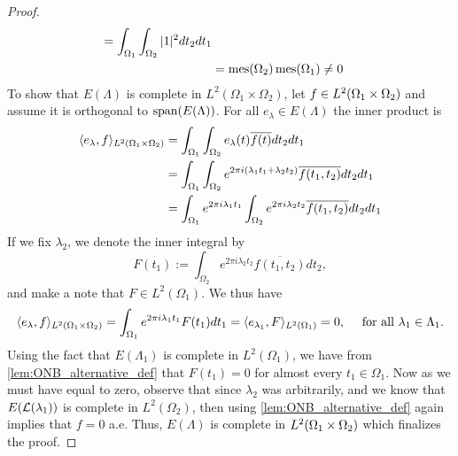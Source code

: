 \documentclass[../thesis.tex]{subfiles}
\begin{document}
\begin{proof}
\begin{align*}
        = \int_{\Omega_1} \int_{\Omega_2} |1|^2 dt_2 dt_1\\
        &= \operatorname{mes}(\Omega_2)\operatorname{mes}(\Omega_1) \neq 0
    \end{align*}
    To show that $E(\Lambda)$ is complete in $L^2(\Omega_1 \times \Omega_2)$, let $f\in L^2(\Omega_1 \times \Omega_2)$ and assume it is orthogonal to $\operatorname{span}(E(\Lambda))$. For all $e_\lambda \in E(\Lambda)$ the inner product is
    \begin{align*} %
        \braa{e_\lambda,f}_{L^2\brac{\Omega_1 \times \Omega_2}}
        &= \int_{\Omega_1} \int_{\Omega_2} e_\lambda(t) \overline{f(t)} dt_2dt_1 \\
        &= \int_{\Omega_1} \int_{\Omega_2} e^{2\pi i  (\lambda_1 t_1 + \lambda_2 t_2)} \overline{f(t_1,t_2)} dt_2 dt_1 \\
        &= \int_{\Omega_1} e^{2 \pi i \lambda_1 t_1} \int_{\Omega_2}e^{2 \pi i \lambda_2 t_2} \overline{f(t_1,t_2)} dt_2 dt_1
    \end{align*}
    If we fix $\lambda_2$, we denote the inner integral by 
    \begin{equation}\label{eq:inner_eq}
        F(t_1) := \int_{\Omega_2} e^{2 \pi i \lambda_2 t_2} \overline{f(t_1,t_2)} dt_2,
    \end{equation}
    and make a note that $F\in L^2(\Omega_1)$. We thus have %
    \begin{equation}\label{eq:outter_eq}
        \langle e_{\lambda}, f\rangle_{L^2(\Omega_1\times \Omega_2)} = \int_{\Omega_1} e^{2 \pi i \lambda_1 t_1} F(t_1) dt_1 = \langle e_{\lambda_1}, F\rangle_{L^2(\Omega_1)} = 0, \quad \text{ for all } \lambda_1 \in \Lambda_1 .
    \end{equation}
    Using the fact that $E(\Lambda_1)$ is complete in $L^2(\Omega_1)$, we have from \cref{lem:ONB_alternative_def} that $F(t_1)=0$ for almost every $t_1 \in \Omega_1$. Now as we must have  equal to zero, observe that since $\lambda_2$ was arbitrarily, and we know that $E(\mathcal{L}(\lambda_1))$ is complete in $L^2(\Omega_2)$, then using \cref{lem:ONB_alternative_def} again implies that $f=0$ a.e. Thus, $E(\Lambda)$ is complete in $L^2(\Omega_1 \times \Omega_2)$ which finalizes the proof.
\end{proof}
\end{document}
